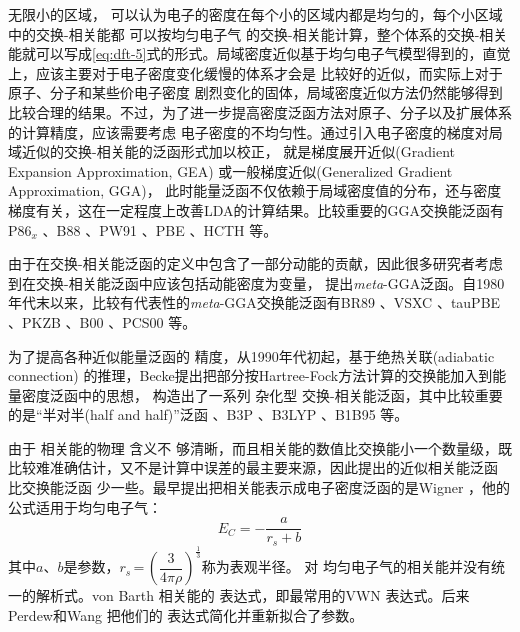 {{无限}小的区域，%
{可以认为}电子的密度在每个小的区域内都是均匀的，每个小区域中的交换-相关能都%
{可以按}均匀电子气%
的交换-相关能{计算}，整个体系的交换-相关能就可以写成\eqref{eq:dft-5}式的形式。局域密度近似基于均匀电子气模型得到的，直觉上，应该主要对于电子密度变化缓慢的体系{才会}是%
比较好的近似，而实际上对于原子、分子和某些价电子密度%
剧烈变化的固体，局域密度近似方法仍然能够得到比较合理的结果。不过，为了进一步提高密度泛函方法对原子、分子以及扩展体系的计算精度，应该需要考虑%
电子密度的不均匀性。通过引入电子密度的梯度对{局域近似的}交换-相关能的{泛函}形式加以校正，%
{就是}梯度展开近似(Gradient Expansion Approximation, GEA)%
{或}一般梯度近似(Generalized Gradient Approximation, GGA)，%
此时能量泛函不仅依赖于局域密度值的分布，还与密度梯度有关，这在一定程度上改善LDA的计算结果。比较重要的GGA交换能泛函有P86$_x$%
、B88%
、PW91%
、PBE%
、HCTH%
等。

由于在交换-相关能泛函的定义中包含了一部分动能的贡献，因此很多研究者考虑{到}在交换-相关{能}泛函中应该包括动能密度为变量，%
{提出}\textit{meta}-GGA泛函。自1980年代末以来，比较有代表性的\textit{meta}-GGA交换能泛函有BR89%
、\linebreak VSXC%
、tauPBE%
、PKZB%
、B00%
、PCS00%
等。

为了提高各种近似{能量}泛函的%
精度，从1990年代初起，基于绝热关联\textrm{(adiabatic connection)}%
{的推理}，Becke提出把部分按Hartree-Fock方法计算的交换能加入到能量密度泛函中的思想{，}%
构造出了一系列%
杂化型%
交换-相关{能}泛函，其中比较重要的是“半对半(half and half)”泛函%
、B3P%
、B3LYP%
、B1B95%
等。

由于%
相关能的物理%
{含}义不%
{够}清晰，而且相关能的数值比交换能小一个数量级，既比较难准确估计，又不是计算中误差的最主要来源，因此提出的{近似}相关能泛函%
比交换能泛函%
少一些。最早提出把相关能表示成电子密度泛函的是Wigner%
，他的公式适用于均匀电子气：
\begin{equation}
  E_C=-\dfrac a{r_s+b}
  \label{eq:dft-16}
\end{equation}
其中$a$、$b$是参数，$r_s$\,=\,$\left(\dfrac3{4\pi\rho}\right)^{\frac13}$称为表观半径。%
对%
均匀电子气的相关能并没有统一\linebreak 的解析式。von Barth%
相关能的%
{表达}式，即最常用的VWN%
{表达}式。后来Perdew和Wang%
把他们的%
{表达}式简化并重新拟合了参数。

}
